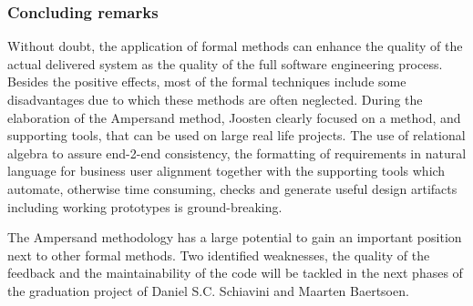 \subsubsection{Concluding remarks}
Without doubt, the application of formal methods can enhance the quality of the actual delivered system as the quality of the full software engineering process. 
Besides the positive effects, most of the formal techniques include some disadvantages due to which these methods are often neglected. 
During the elaboration of the Ampersand method, Joosten clearly focused on a method, and supporting tools, that can be used on large real life projects. 
The use of relational algebra to assure end-2-end consistency, the formatting of requirements in natural language for business user alignment together with the supporting tools which automate, otherwise time consuming, checks and  generate useful design artifacts including working prototypes is ground-breaking.

The Ampersand methodology has a large potential to gain an important position next to other formal methods. 
Two identified weaknesses, the quality of the feedback and the maintainability of the code will be tackled in the next phases of the graduation project of  Daniel S.C. Schiavini and Maarten Baertsoen.






